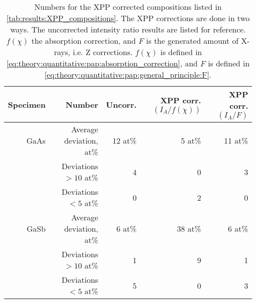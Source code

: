 \begin{table}[phtb]
    \begin{center}
        \caption{
            Numbers for the XPP corrected compositions listed in \cref{tab:results:XPP_compositions}.
            The XPP corrections are done in two ways.
            The uncorrected intensity ratio results are listed for reference.
            $f(\chi)$ the absorption correction, and $F$ is the generated amount of X-rays, i.e. Z corrections.
            $f(\chi)$ is defined in \cref{eq:theory:quantitative:pap:absorption_correction}, and $F$ is defined in \cref{eq:theory:quantitative:pap:general_principle:F}.
        }
        \label{tab:results:XPP_compositions_stats}
        \begin{tabular}{rrrrr}
            \hline
            \textbf{Specimen} & \textbf{Number}         & \textbf{Uncorr.} & \textbf{XPP corr. $(I_A/f(\chi))$} & \textbf{XPP corr. $(I_A/F)$} \\
            \hline

            GaAs              & Average deviation, at\% & 12 at\%          & 5 at\%                             & 11 at\%                      \\
                              & Deviations $>10$ at\%   & 4                & 0                                  & 3                            \\
                              & Deviations  $<5$  at\%  & 0                & 2                                  & 0                            \\
            \hline

            GaSb              & Average deviation, at\% & 6 at\%           & 38 at\%                            & 6 at\%                       \\
                              & Deviations $>10$ at\%   & 1                & 9                                  & 1                            \\
                              & Deviations  $<5$  at\%  & 5                & 0                                  & 3                            \\

            \hline
        \end{tabular}
    \end{center}
\end{table}
